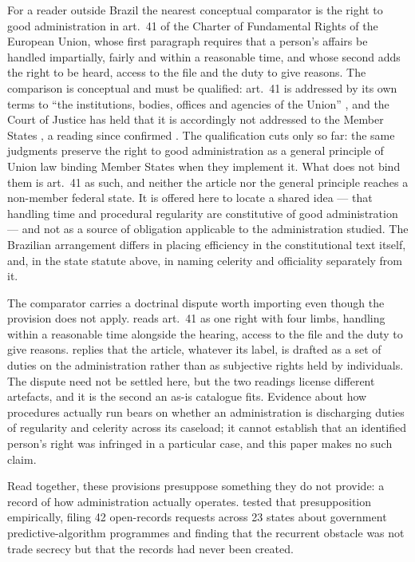 For a reader outside Brazil the nearest conceptual comparator is the right to good
administration in art.~41 of the Charter of Fundamental Rights of the European Union, whose
first paragraph requires that a person's affairs be handled impartially, fairly and within a
reasonable time, and whose second adds the right to be heard, access to the file and the duty
to give reasons. The comparison is conceptual and must be qualified: art.~41 is addressed by
its own terms to ``the institutions, bodies, offices and agencies of the Union''
\citep{eu2012charter}, and the Court of Justice has held that it is accordingly not addressed
to the Member States \citep[para.~67]{cjeu2014ys}, a reading since confirmed
\citep[para.~44]{cjeu2014mukarubega}. The qualification cuts only so far: the same judgments
preserve the right to good administration as a general principle of Union law binding Member
States when they implement it. What does not bind them is art.~41 as such, and neither the
article nor the general principle reaches a non-member federal state. It is offered here to
locate a shared idea --- that handling time and procedural regularity are constitutive of good
administration --- and not as a source of obligation applicable to the administration studied.
The Brazilian arrangement differs in placing efficiency in the constitutional text itself, and,
in the state statute above, in naming celerity and officiality separately from it.

The comparator carries a doctrinal dispute worth importing even though the provision does not
apply. \citet{craig2022article41} reads art.~41 as one right with four limbs, handling within a
reasonable time alongside the hearing, access to the file and the duty to give reasons.
\citet{bousta2013goodadministration} replies that the article, whatever its label, is drafted as
a set of duties on the administration rather than as subjective rights held by individuals. The
dispute need not be settled here, but the two readings license different artefacts, and it is
the second an as-is catalogue fits. Evidence about how procedures actually run bears on whether
an administration is discharging duties of regularity and celerity across its caseload; it
cannot establish that an identified person's right was infringed in a particular case, and this
paper makes no such claim.

Read together, these provisions presuppose something they do not provide: a record of how
administration actually operates. \citet{brauneis2018algorithmic} tested that presupposition
empirically, filing 42 open-records requests across 23 states about government
predictive-algorithm programmes and finding that the recurrent obstacle was not trade
secrecy but that the records had never been created.


